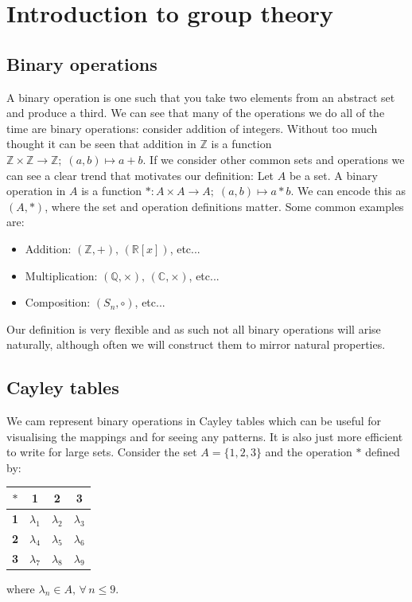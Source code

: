 \documentclass[12pt]{article}
\begin{document}
\section{Introduction to group theory}
\subsection*{Binary operations}
A binary operation is one such that you take two elements from an abstract set and produce a third. We can see that many of the operations we do all of the time are binary operations: consider addition of integers. Without too much thought it can be seen that addition in \(\mathbb{Z}\) is a function \(\mathbb{Z}\times\mathbb{Z}\to\mathbb{Z};\; (a,b)\mapsto a+b\). If we consider other common sets and operations we can see a clear trend that motivates our definition: Let \(A\) be a set. A binary operation in \(A\) is a function \(*:A\times A\to A;\;(a,b)\mapsto a*b\). We can encode this as \((A,*)\), where the set and operation definitions matter. Some common examples are:
\begin{itemize}
    \item Addition: \((\mathbb{Z},+),\,(\mathbb{R}[x])\), etc...
    \item Multiplication: \((\mathbb{Q},\times),\,(\mathbb{C},\times)\), etc...
    \item Composition: \((S_n,\circ)\), etc...
\end{itemize}
Our definition is very flexible and as such not all binary operations will arise naturally, although often we will construct them to mirror natural properties.
\subsection*{Cayley tables}
We cam represent binary operations in Cayley tables which can be useful for visualising the mappings and for seeing any patterns. It is also just more efficient to write for large sets. Consider the set \(A=\{1,2,3\}\) and the operation \(*\) defined by:
\begin{table}[H]
    \begin{tabular}{c|c c c}
        \(*\) & \textbf{1} & \textbf{2} & \textbf{3} \\ \hline
        \textbf{1} & \(\lambda_1\) & \(\lambda_2\) & \(\lambda_3\) \\
        \textbf{2} & \(\lambda_4\) & \(\lambda_5\) & \(\lambda_6\) \\
        \textbf{3} & \(\lambda_7\) & \(\lambda_8\) & \(\lambda_9\) \\
    \end{tabular}
\end{table}
where \(\lambda_n\in A,\,\forall\, n\leq9\).
\end{document}
